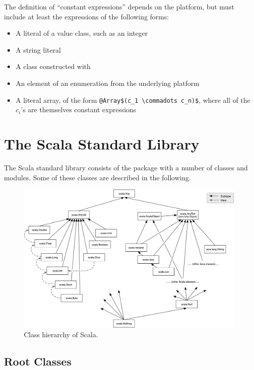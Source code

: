 {The definition of ``constant expressions'' depends on the platform, but
must include at least the expressions of the following forms:
\begin{itemize}
\item A literal of a value class, such as an integer
\item A string literal
\item A class constructed with 
\item An element of an enumeration from the underlying platform
\item A literal array, of the form
      \lstinline^@Array$(c_1 \commadots c_n)$^,
      where all of the $c_i$'s are themselves constant expressions
\end{itemize}


\chapter{The Scala Standard Library}

The Scala standard library consists of the package  with a
number of classes and modules. Some of these classes are described in
the following.

\begin{figure}
\label{fig:class-hierarchy}
\centering
\includegraphics[scale=0.40]{classhierarchy}
\vspace*{-1.5mm}
\caption{Class hierarchy of Scala.}
\end{figure}

\section{Root Classes}
\label{sec:cls-root}
\label{sec:cls-any}
\label{sec:cls-object}

}
